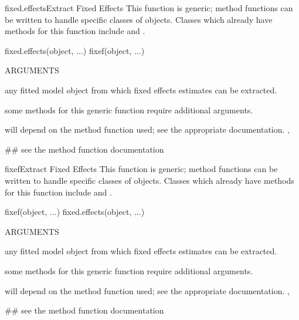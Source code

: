 \documentclass[pdftex]{article} \usepackage{url,graphicx}
\begin{document}
\begin{Helpfile}{fixed.effects}{Extract Fixed Effects}
This function is generic; method functions can be written to handle
specific classes of objects. Classes which already have methods for
this function include  and .
\begin{Example}
fixed.effects(object, ...)
fixef(object, ...)
\end{Example}
\begin{Argument}{ARGUMENTS}
\item[\Co{object:}]
any fitted model object from which fixed effects
estimates can be extracted.
\item[\Co{...:}]
some methods for this generic function require additional
arguments.
\end{Argument}
will depend on the method function used; see the appropriate documentation.
,
\need 15pt
\vspace{-16pt}
\begin{Example}
## see the method function documentation
\end{Example}
\end{Helpfile}
\begin{Helpfile}{fixef}{Extract Fixed Effects}
This function is generic; method functions can be written to handle
specific classes of objects. Classes which already have methods for
this function include  and .
\begin{Example}
fixef(object, ...)
fixed.effects(object, ...)
\end{Example}
\begin{Argument}{ARGUMENTS}
\item[\Co{object:}]
any fitted model object from which fixed effects
estimates can be extracted.
\item[\Co{...:}]
some methods for this generic function require additional
arguments.
\end{Argument}
will depend on the method function used; see the appropriate documentation.
,
\need 15pt
\vspace{-16pt}
\begin{Example}
## see the method function documentation
\end{Example}
\end{Helpfile}
\end{document}
